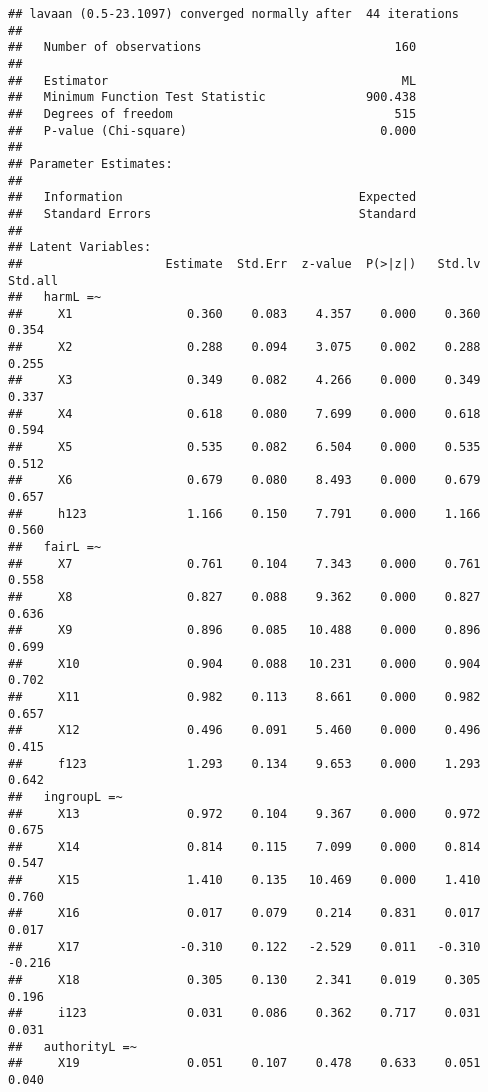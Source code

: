 \documentclass[english,man]{apa6}
\newcounter{author}
\theoremstyle{definition}
\theoremstyle{definition}
\theoremstyle{definition}
\theoremstyle{remark}
\begin{document}
\begin{verbatim}
## lavaan (0.5-23.1097) converged normally after  44 iterations
## 
##   Number of observations                           160
## 
##   Estimator                                         ML
##   Minimum Function Test Statistic              900.438
##   Degrees of freedom                               515
##   P-value (Chi-square)                           0.000
## 
## Parameter Estimates:
## 
##   Information                                 Expected
##   Standard Errors                             Standard
## 
## Latent Variables:
##                    Estimate  Std.Err  z-value  P(>|z|)   Std.lv  Std.all
##   harmL =~                                                              
##     X1                0.360    0.083    4.357    0.000    0.360    0.354
##     X2                0.288    0.094    3.075    0.002    0.288    0.255
##     X3                0.349    0.082    4.266    0.000    0.349    0.337
##     X4                0.618    0.080    7.699    0.000    0.618    0.594
##     X5                0.535    0.082    6.504    0.000    0.535    0.512
##     X6                0.679    0.080    8.493    0.000    0.679    0.657
##     h123              1.166    0.150    7.791    0.000    1.166    0.560
##   fairL =~                                                              
##     X7                0.761    0.104    7.343    0.000    0.761    0.558
##     X8                0.827    0.088    9.362    0.000    0.827    0.636
##     X9                0.896    0.085   10.488    0.000    0.896    0.699
##     X10               0.904    0.088   10.231    0.000    0.904    0.702
##     X11               0.982    0.113    8.661    0.000    0.982    0.657
##     X12               0.496    0.091    5.460    0.000    0.496    0.415
##     f123              1.293    0.134    9.653    0.000    1.293    0.642
##   ingroupL =~                                                           
##     X13               0.972    0.104    9.367    0.000    0.972    0.675
##     X14               0.814    0.115    7.099    0.000    0.814    0.547
##     X15               1.410    0.135   10.469    0.000    1.410    0.760
##     X16               0.017    0.079    0.214    0.831    0.017    0.017
##     X17              -0.310    0.122   -2.529    0.011   -0.310   -0.216
##     X18               0.305    0.130    2.341    0.019    0.305    0.196
##     i123              0.031    0.086    0.362    0.717    0.031    0.031
##   authorityL =~                                                         
##     X19               0.051    0.107    0.478    0.633    0.051    0.040

\end{verbatim}
\end{document}
